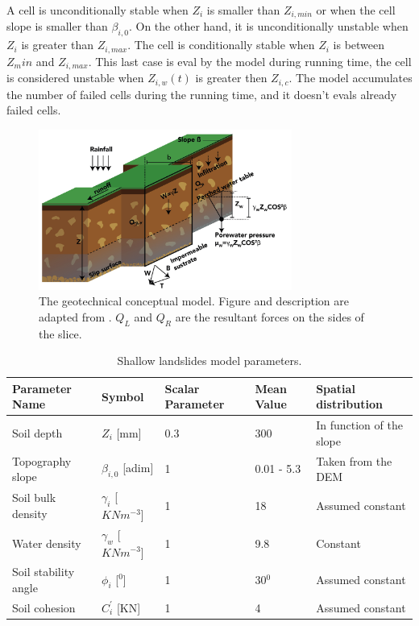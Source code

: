 \documentclass[hess, manuscript]{copernicus}
\begin{document}
A cell is unconditionally stable when $Z_i$ is smaller than $Z_{i,min}$ or when the cell slope is smaller than  $ \beta_{i,0}$. On the other hand, it is unconditionally unstable when $Z_i$ is greater than $Z_{i,max}$. The cell is conditionally stable when $Z_i$ is between $Z_min$ and $Z_{i,max}$.  This last case is eval by the model during running time, the cell is considered unstable when $Z_{i,w}(t)$ is greater then $Z_{i,c}$.  The model accumulates the number of failed cells during the running time, and it doesn't evals already failed cells.

\begin{figure}[t]
\centering
 \includegraphics[width=8.3cm]{Figures/slides-escheme.jpg}
 \caption{The geotechnical conceptual model. Figure and description are adapted from \citet{Aristizabal2016}. $Q_L$ and $Q_R$ are the resultant forces on the sides of the slice. }
    \label{fig:ModeloEstabilidad}
\end{figure}

\begin{table}[]
        \centering
        \begin{tabularx}{\textwidth}{p{3cm} p{2.2cm} p{1.5cm} p{2cm} p{3.5cm}}
\hline
Parameter Name & Symbol & Scalar Parameter & Mean Value & Spatial distribution \\
\hline
Soil depth & $Z_i$ [mm] & 0.3 & 300 & In function of the slope \\
Topography slope & $\beta_{i,0}$ [adim] & 1 & 0.01 - 5.3 & Taken from the DEM \\
Soil bulk density & $\gamma_i$ [$KNm^{-3}$] & 1  & 18  & Assumed constant\\
Water density & $\gamma_w$ [$KNm^{-3}$] & 1 & 9.8 & Constant\\
Soil stability angle & $\phi_i$ [$^0$] & 1 & 30$^0$ & Assumed constant\\
Soil cohesion & $C^{'}_i$ [KN] & 1 & 4 & Assumed constant\\
\hline
\end{tabularx}
\caption{Shallow landslides model parameters.}
\label{tab:landslide}
\end{table}
\end{document}
